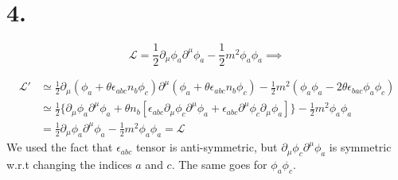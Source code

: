 \documentclass{article}
\newcommand{\pdm}{\partial_\mu}  %
\newcommand{\pdup}{\partial^\mu}  %
\newcommand{\Lag}{\mathcal{L}}  %
\newcommand{\onehalf}{\frac{1}{2}}
\begin{document}
\section*{4.}
\begin{equation}
    \Lag = \onehalf\pdm \phi_a \pdup \phi_a - \onehalf m^2 \phi_a\phi_a \implies 
\end{equation}

\begin{equation}
    \begin{split}
        \Lag' & \simeq \onehalf\pdm(\phi_a + \theta\epsilon_{abc}n_b\phi_c)\pdup (\phi_a + \theta\epsilon_{abc}n_b\phi_c)-
        \onehalf m^2 (\phi_a\phi_a - 2\theta \epsilon_{bac}\phi_a\phi_c)\\
        & \simeq \onehalf \{\pdm \phi_a \pdup\phi_a + \theta n_b \left[\epsilon_{abc}\pdm\phi_c \pdup\phi_a 
        + \epsilon_{abc}\pdup\phi_c \pdm\phi_a  \right]  \} - \onehalf m^2 \phi_a\phi_a \\
        & = \onehalf\pdm \phi_a \pdup \phi_a - \onehalf m^2 \phi_a\phi_a = \Lag
    \end{split}
\end{equation}
We used the fact that $\epsilon_{abc}$ tensor is anti-symmetric, but $\pdm\phi_c \pdup\phi_a$ is symmetric w.r.t
changing the indices $a$ and $c$. The same goes for $\phi_a\phi_c$.
\end{document}
